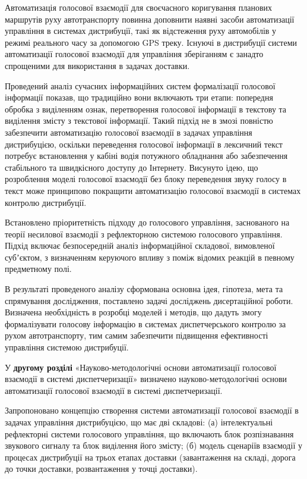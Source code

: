 Автоматизація голосової взаємодії для своєчасного коригування планових маршрутів руху автотранспорту повинна доповнити наявні засоби автоматизації управління в системах дистрибуції, такі як відстеження руху автомобілів у режимі реального часу за допомогою GPS треку. Існуючі в дистрибуції системи автоматизації голосової взаємодії для управління зберіганням є занадто спрощеними для використання в задачах доставки.

Проведений аналіз сучасних інформаційних систем формалізації голосової інформації показав, що традиційно вони включають три етапи: попередня обробка з виділенням ознак, перетворення голосової інформації в текстову та виділення змісту з текстової інформації. Такий підхід не в змозі повністю забезпечити автоматизацію голосової взаємодії в задачах управління дистрибуцією, оскільки переведення голосової інформації в лексичний текст потребує встановлення у кабіні водія потужного обладнання або забезпечення стабільного та швидкісного доступу до Інтернету. Висунуто ідею, що розроблення моделі голосової взаємодії без блоку переведення звуку голосу в текст може принципово покращити автоматизацію голосової взаємодії в системах контролю дистрибуції.

Встановлено пріоритетність підходу до голосового управління, заснованого на теорії несилової взаємодії з рефлекторною системою голосового управління. Підхід включає безпосередній аналіз інформаційної складової, вимовленої субʼєктом, з визначенням керуючого впливу з поміж відомих реакцій в певному предметному полі.

В результаті проведеного аналізу сформована основна ідея, гіпотеза, мета та спрямування дослідження, поставлено задачі досліджень дисертаційної роботи. Визначена необхідність в розробці моделей і методів, що дадуть змогу формалізувати голосову інформацію в системах диспетчерського контролю за рухом автотранспорту, тим самим забезпечити підвищення ефективності управління системою дистрибуції.

У \textbf{другому розділі} «Науково-методологічні основи автоматизації голосової взаємодії в системі диспетчеризації» визначено науково-методологічні основи автоматизації голосової взаємодії в системі диспетчеризації. 

Запропоновано концепцію створення системи автоматизації голосової взаємодії в задачах управління дистрибуцією, що має дві складові: (а) інтелектуальні рефлекторні системи голосового управління, що включають блок розпізнавання звукового сигналу та блок виділення його змісту; (б) модель сценаріїв взаємодії у процесах дистрибуції на трьох етапах доставки (завантаження на складі, дорога до точки доставки, розвантаження у точці доставки).

